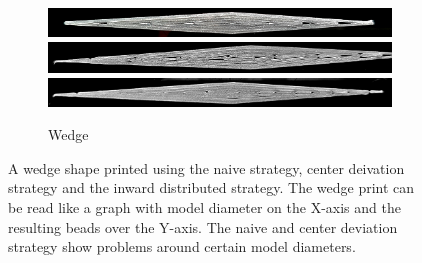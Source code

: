 \begin{figure}
\centering
\begin{subfigure}{\columnwidth}\centering
\setlength{\figwidth}{\columnwidth}
\includegraphics[width=\figwidth]{sources/applications/P3_print_wedge_naive_edited.png}
\includegraphics[width=\figwidth]{sources/applications/P3_print_wedge_center_edited.png}
\includegraphics[width=\figwidth]{sources/applications/P3_print_wedge_inward_edited.png}
\caption{Wedge}\label{print_wedge}
\end{subfigure}
\caption{
A wedge shape printed using the naive strategy, center deivation strategy and the inward distributed strategy.
The wedge print can be read like a graph with model diameter on the X-axis and the resulting beads over the Y-axis.
The naive and center deviation strategy show problems around certain model diameters.
}
\label{wedge_print}
\end{figure}

